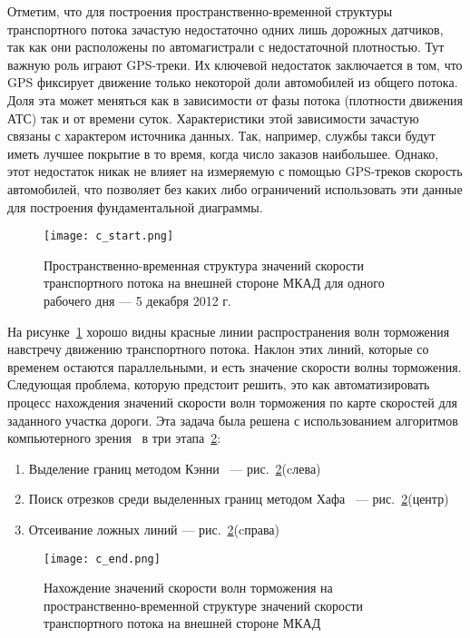 Отметим, что для построения пространственно-временной структуры транспортного потока зачастую недостаточно одних лишь дорожных датчиков, так как они расположены по автомагистрали с недостаточной плотностью.
Тут важную роль играют GPS-треки.
Их ключевой недостаток заключается в том, что GPS фиксирует движение только некоторой доли автомобилей из общего потока.
Доля эта может меняться как в зависимости от фазы потока (плотности движения АТС) так и от времени суток.
Характеристики этой зависимости зачастую связаны с характером источника данных.
Так, например, службы такси будут иметь лучшее покрытие в то время, когда число заказов наибольшее.
Однако, этот недостаток никак не влияет на измеряемую с помощью GPS-треков скорость автомобилей, что позволяет без каких либо ограничений использовать эти данные для построения фундаментальной диаграммы.
\begin{figure}[ht]
\begin{center}
\texttt{[image: c\_start.png]}
\caption{Пространственно-временная структура значений скорости транспортного потока на внешней стороне МКАД для одного рабочего дня --- 5 декабря 2012 г.}
\label{fig:cstart}
\end{center}
\end{figure}


На рисунке~\ref{fig:cstart} хорошо видны красные линии распространения волн торможения навстречу движению транспортного потока. 
Наклон этих линий, которые со временем остаются параллельными, и есть значение скорости волны торможения. 
Следующая проблема, которую предстоит решить, это как автоматизировать процесс нахождения значений скорости волн торможения по карте скоростей для заданного участка дороги. 
Эта задача была решена с использованием алгоритмов компьютерного зрения~\cite{bradski2000dr} в три этапа~\ref{fig:cend}:
\begin{enumerate}
  \item Выделение границ методом Кэнни~\cite{canny1986computational} --- рис.~\ref{fig:cend}(cлева)
  \item Поиск отрезков среди выделенных границ методом Хафа~\cite{matas2000robust}  --- рис.~\ref{fig:cend}(центр)
  \item Отсеивание ложных линий  --- рис.~\ref{fig:cend}(cправа)
\end{enumerate}
\begin{figure}[ht]
\begin{center}
\texttt{[image: c\_end.png]}
\caption{Нахождение значений скорости волн торможения на пространственно-временной структуре значений скорости транспортного потока на внешней стороне МКАД}
\label{fig:cend}
\end{center}
\end{figure}


